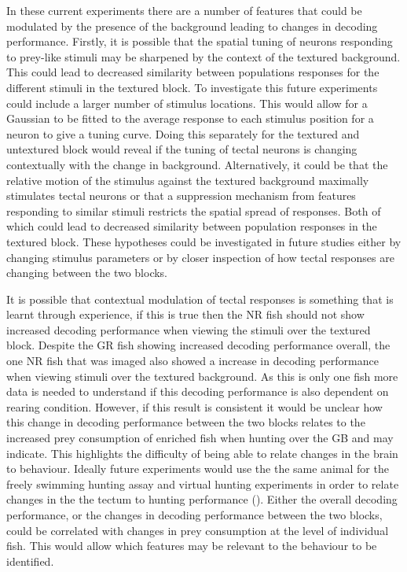 In these current experiments there are a number of features that could be modulated by the presence of the background leading to changes in decoding performance. Firstly, it is possible that the spatial tuning of neurons responding to prey-like stimuli may be sharpened by the context of the textured background. This could lead to decreased similarity between populations responses for the different stimuli in the textured block. To investigate this future experiments could include a larger number of stimulus locations. This would allow for a Gaussian to be fitted to the average response to each stimulus position for a neuron to give a tuning curve. Doing this separately for the textured and untextured block would reveal if the tuning of tectal neurons is changing contextually with the change in background. Alternatively, it could be that the relative motion of the stimulus against the textured background maximally stimulates tectal neurons or that a suppression mechanism from features responding to similar stimuli restricts the spatial spread of responses. Both of which could lead to decreased similarity between population responses in the textured block. These hypotheses could be investigated in future studies either by changing stimulus parameters or by closer inspection of how tectal responses are changing between the two blocks.

 It is possible that contextual modulation of tectal responses is something that is learnt through experience, if this is true then the NR fish should not show increased decoding performance when viewing the stimuli over the textured block. Despite the GR fish showing increased decoding performance overall, the one NR fish that was imaged also showed a increase in decoding performance when viewing stimuli over the textured background. As this is only one fish more data is needed to understand if this decoding performance is also dependent on rearing condition. However, if this result is consistent it would be unclear how this change in decoding performance between the two blocks relates to the increased prey consumption of enriched fish when hunting over the GB and may indicate. This highlights the difficulty of being able to relate changes in the brain to behaviour. Ideally future experiments would use the the same animal for the freely swimming hunting assay and virtual hunting experiments in order to relate changes in the the tectum to hunting performance (\cite{Avitan2019}). Either the overall decoding performance, or the changes in decoding performance between the two blocks, could be correlated with changes in prey consumption at the level of individual fish. This would allow which features may be relevant to the behaviour to be identified.
 
